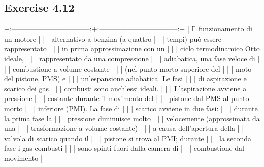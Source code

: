 \documentclass[letterpaper,10pt,italian]{jupyterBook}
\begin{document}
\subsection{Exercise 4.12}
\label{\detokenize{polimi/fluidmechanics-ita/template/capitoli/04_bilanci/04e02in:exercise-4-12}}\label{\detokenize{polimi/fluidmechanics-ita/template/capitoli/04_bilanci/04e02in:fluid-mechanics-balances-ex-12}}\label{\detokenize{polimi/fluidmechanics-ita/template/capitoli/04_bilanci/04e02in::doc}}
\sphinxAtStartPar
+:———————————:+:———————————:+
| Il funzionamento di un motore     |                                   |
| alternativo a benzina (a quattro  |                                   |
| tempi) può essere rappresentato   |                                   |
| in prima approssimazione con un   |                                   |
| ciclo termodinamico Otto ideale,  |                                   |
| rappresentato da una compressione |                                   |
| adiabatica, una fase veloce di    |                                   |
| combustione a volume costante     |                                   |
| (nel punto morto superiore del    |                                   |
| moto del pistone, PMS) e          |                                   |
| un’espansione adiabatica. Le fasi |                                   |
| di aspirazione e scarico dei gas  |                                   |
| combusti sono anch’essi ideali.   |                                   |
| L’aspirazione avviene a pressione |                                   |
| costante durante il movimento del |                                   |
| pistone dal PMS al punto morto    |                                   |
| inferiore (PMI). La fase di       |                                   |
| scarico avviene in due fasi:      |                                   |
| durante la prima fase la          |                                   |
| pressione diminuisce molto        |                                   |
| velocemente (approssimata da una  |                                   |
| trasformazione a volume costante) |                                   |
| a causa dell’apertura della       |                                   |
| valvola di scarico quando il      |                                   |
| pistone si trova al PMI; durante  |                                   |
| la seconda fase i gas combusti    |                                   |
| sono spinti fuori dalla camera di |                                   |
| combustione dal movimento         |                                   |
\end{document}
